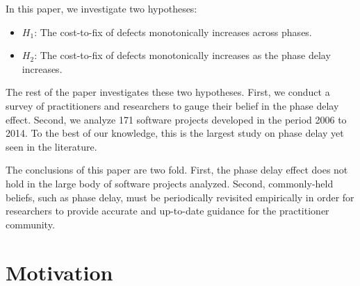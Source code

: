 \documentclass{sig-alternate}
\newcommand{\bi}{\begin{itemize}[leftmargin=0.4cm]}
\newcommand{\ei}{\end{itemize}}
\newcommand{\be}{\begin{enumerate}}
\newcommand{\ee}{\end{enumerate}}
\begin{document}

In this paper, we investigate two hypotheses:

\bi
    \item $H_1$: The cost-to-fix of defects monotonically increases across phases.
    \item $H_2$: The cost-to-fix of defects monotonically increases as the phase delay increases.
\ei
The rest of the paper investigates these two hypotheses. First, we conduct a survey of practitioners and researchers to gauge their belief in the phase delay effect. Second, we  analyze 171 software  projects developed in the period 2006 to 2014.  To the best of our knowledge, this is the largest study on phase delay yet seen in the literature.




 
 
The conclusions of this paper are two fold. First, the phase delay effect does not hold in the large body of software projects analyzed. Second, commonly-held beliefs, such as phase delay, must be periodically revisited empirically in order for researchers to provide accurate and up-to-date guidance for the practitioner community.



\section{Motivation}
\end{document}
